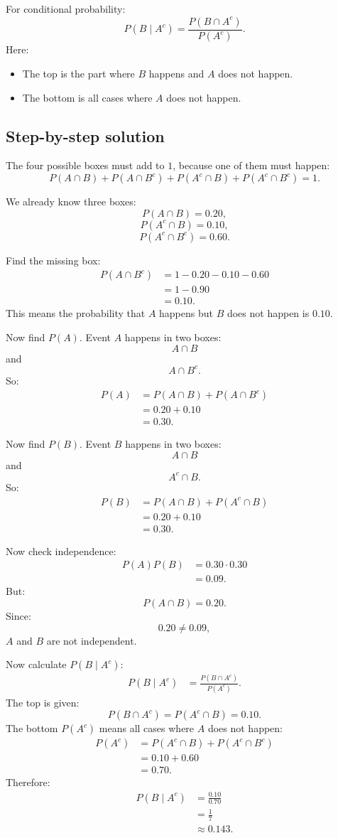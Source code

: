 \documentclass[11pt,a4paper]{article}
\begin{document}
For conditional probability:
\[
P(B\mid A^c)=\frac{P(B\cap A^c)}{P(A^c)}.
\]
Here:
\begin{itemize}[leftmargin=*]
    \item The top is the part where \(B\) happens and \(A\) does not happen.
    \item The bottom is all cases where \(A\) does not happen.
\end{itemize}

\subsection*{Step-by-step solution}
The four possible boxes must add to \(1\), because one of them must happen:
\[
P(A\cap B)+P(A\cap B^c)+P(A^c\cap B)+P(A^c\cap B^c)=1.
\]

We already know three boxes:
\[
P(A\cap B)=0.20,
\]
\[
P(A^c\cap B)=0.10,
\]
\[
P(A^c\cap B^c)=0.60.
\]

Find the missing box:
\begin{align*}
P(A\cap B^c)
&=1-0.20-0.10-0.60\\
&=1-0.90\\
&=0.10.
\end{align*}
This means the probability that \(A\) happens but \(B\) does not happen is \(0.10\).

Now find \(P(A)\). Event \(A\) happens in two boxes:
\[
A\cap B
\]
and
\[
A\cap B^c.
\]
So:
\begin{align*}
P(A)
&=P(A\cap B)+P(A\cap B^c)\\
&=0.20+0.10\\
&=0.30.
\end{align*}

Now find \(P(B)\). Event \(B\) happens in two boxes:
\[
A\cap B
\]
and
\[
A^c\cap B.
\]
So:
\begin{align*}
P(B)
&=P(A\cap B)+P(A^c\cap B)\\
&=0.20+0.10\\
&=0.30.
\end{align*}

Now check independence:
\begin{align*}
P(A)P(B)
&=0.30\cdot 0.30\\
&=0.09.
\end{align*}
But:
\[
P(A\cap B)=0.20.
\]
Since:
\[
0.20\neq 0.09,
\]
\(A\) and \(B\) are not independent.

Now calculate \(P(B\mid A^c)\):
\begin{align*}
P(B\mid A^c)
&=\frac{P(B\cap A^c)}{P(A^c)}.
\end{align*}
The top is given:
\[
P(B\cap A^c)=P(A^c\cap B)=0.10.
\]
The bottom \(P(A^c)\) means all cases where \(A\) does not happen:
\begin{align*}
P(A^c)
&=P(A^c\cap B)+P(A^c\cap B^c)\\
&=0.10+0.60\\
&=0.70.
\end{align*}
Therefore:
\begin{align*}
P(B\mid A^c)
&=\frac{0.10}{0.70}\\
&=\frac{1}{7}\\
&\approx 0.143.
\end{align*}
\end{document}
